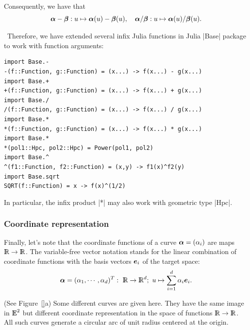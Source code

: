 \begin{coding}[Algebraic computation of FE = $\delta_1$]
{Consequently, we have that
\[
{\mbox{\boldmath $\alpha$}} - {\mbox{\boldmath $\beta$}} : u \mapsto {\mbox{\boldmath $\alpha$}}(u) - {\mbox{\boldmath $\beta$}}(u),
\quad 
{\mbox{\boldmath $\alpha$}} / {\mbox{\boldmath $\beta$}} : u \mapsto {\mbox{\boldmath $\alpha$}}(u) / {\mbox{\boldmath $\beta$}} (u).
\]

\begin{coding}\ 
Therefore, we have extended several infix Julia functions in Julia |Base| package to work with function arguments:
\begin{lstlisting}[language=JuliaLocal, style=julia, mathescape=true]
import Base.-
-(f::Function, g::Function) = (x...) -> f(x...) - g(x...)  
import Base.+  
+(f::Function, g::Function) = (x...) -> f(x...) + g(x...)  
import Base./  
/(f::Function, g::Function) = (x...) -> f(x...) / g(x...)  
import Base.*  
*(f::Function, g::Function) = (x...) -> f(x...) * g(x...)  
import Base.*
*(pol1::Hpc, pol2::Hpc) = Power(pol1, pol2)
import Base.^
^(f1::Function, f2::Function) = (x,y) -> f1(x)^f2(y) 
import Base.sqrt
SQRT(f::Function) = x -> f(x)^(1/2) 
\end{lstlisting}
In particular, the infix product |*| may also work with geometric type |Hpc|.
\end{coding}




\subsubsection*{Coordinate representation}

Finally, let’s note that the coordinate functions of a curve ${\mbox{\boldmath $\alpha$}}
= (\alpha_{i})$ are maps $\mathbb{I\!\!R}\rightarrow\mathbb{I\!\!R}$.  The variable-free
vector notation stands for the linear combination of coordinate
functions with the basis vectors ${\mbox{\boldmath $e$}}_{i}$ of the target space:
\[
{\mbox{\boldmath $\alpha$}} = ({\alpha}_{1}, \cdots, {\alpha}_{d})^{T}:\
\mathbb{I\!\!R}\rightarrow\mathbb{I\!\!R}^{d} ;\ u \mapsto
\sum_{i=1}^{d} {\alpha}_{i} {\mbox{\boldmath $e$}}_{i}.
\]


%
%
%
%
%
\begin{condition} (See Figure~\ref{}a)
\label{ex:5:4:circumference}
Some different curves are given here.  They have the same image in $
\mathbb{I\!\!E}^{2}$ but different coordinate representation in the space of
functions $\mathbb{I\!\!R}\rightarrow\mathbb{I\!\!R}$.  All such curves generate a circular arc
of unit radius centered at the origin.
\begin{enumerate}
  

\end{enumerate}
\end{condition}}
\end{coding}
